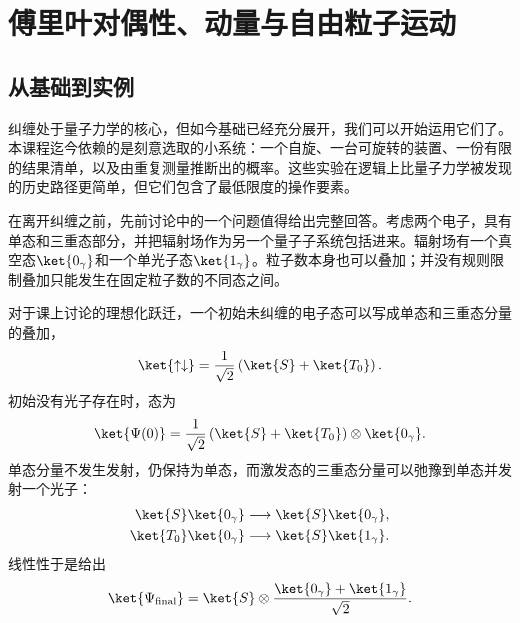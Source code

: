 \chapter{傅里叶对偶性、动量与自由粒子运动}

\section{从基础到实例}

纠缠处于量子力学的核心，但如今基础已经充分展开，我们可以开始运用它们了。本课程迄今依赖的是刻意选取的小系统：一个自旋、一台可旋转的装置、一份有限的结果清单，以及由重复测量推断出的概率。这些实验在逻辑上比量子力学被发现的历史路径更简单，但它们包含了最低限度的操作要素。

\begin{classroomqa}
\end{classroomqa}

\begin{classroomqa}
\end{classroomqa}

在离开纠缠之前，先前讨论中的一个问题值得给出完整回答。考虑两个电子，具有单态和三重态部分，并把辐射场作为另一个量子子系统包括进来。辐射场有一个真空态\(\ket{0_\gamma}\)和一个单光子态\(\ket{1_\gamma}\)。粒子数本身也可以叠加；并没有规则限制叠加只能发生在固定粒子数的不同态之间。

对于课上讨论的理想化跃迁，一个初始未纠缠的电子态可以写成单态和三重态分量的叠加，
\begin{equation}
\ket{\uparrow\downarrow}
=
\frac{1}{\sqrt{2}}
\left(\ket{S}+\ket{T_0}\right).
\end{equation}
初始没有光子存在时，态为
\begin{equation}
\ket{\Psi(0)}
=
\frac{1}{\sqrt{2}}
\left(\ket{S}+\ket{T_0}\right)
\otimes\ket{0_\gamma}.
\label{eq:l9-initial-radiative-state}
\end{equation}
单态分量不发生发射，仍保持为单态，而激发态的三重态分量可以弛豫到单态并发射一个光子：
\begin{align}
\ket{S}\ket{0_\gamma}
&\longrightarrow
\ket{S}\ket{0_\gamma}, \\
\ket{T_0}\ket{0_\gamma}
&\longrightarrow
\ket{S}\ket{1_\gamma}.
\end{align}
线性性于是给出
\begin{equation}
\ket{\Psi_{\mathrm{final}}}
=
\ket{S}\otimes
\frac{\ket{0_\gamma}+\ket{1_\gamma}}{\sqrt{2}}.
\label{eq:l9-final-radiative-state}
\end{equation}

